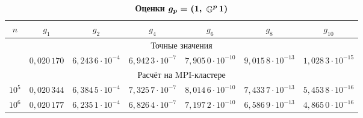 \begin{table}

\centering

\begin{minipage}{15.5cm}



\small



\caption{\bf Оценки $\boldsymbol{g_p=\left({\mathbf{1}},\ {\mathop{\mathbb{G}}\nolimits^p\mathbf{1}}\right)}$} \vspace{-3mm}

\centering

\begin{tabular}{c|c|c|c|c|c|c}

        \hline

\footnotesize $n$&

\footnotesize $g_1$&

\footnotesize $g_2$&

\footnotesize $g_4$&

\footnotesize $g_6$&

\footnotesize $g_8$&

\footnotesize $g_{10}$\\

        \hline

        \hline

        \multicolumn{7}{c}{\rule{0mm}{12pt}Точные значения}\\

        \hline

        \rule{0mm}{12pt}%

&$0,020\,170$&$6,243\,6\cdot10^{-4}$&$6,942\,3\cdot10^{-7}$&$7,905\,0\cdot10^{-10}$&$9,015\,8\cdot10^{-13}$&$1,028\,3\cdot10^{-15}$\\

        \hline

        \multicolumn{7}{c}{\rule{0mm}{12pt}Расчёт на MPI-кластере}\\

        \hline

        \rule{0mm}{12pt}%

    $10^5$&$0,020\,344$&$6,384\,5\cdot10^{-4}$&$7,325\,7\cdot10^{-7}$&$8,014\,6\cdot10^{-10}$&$7,433\,7\cdot10^{-13}$&$5,453\,8\cdot10^{-16}$\\

        $10^6$&$0,020\,177$&$6,235\,1\cdot10^{-4}$&$6,826\,4\cdot10^{-7}$&$7,197\,2\cdot10^{-10}$&$6,586\,9\cdot10^{-13}$&$4,865\,0\cdot10^{-16}$\\


\end{tabular}
\end{minipage}
\end{table}
